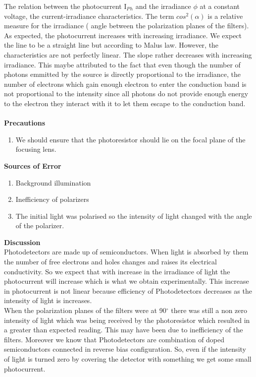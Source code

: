 \documentclass[12pt]{report}
\begin{document}
The relation between the photocurrent I$_P$$_h$ and the irradiance $\phi$ at a constant voltage, the current-irradiance characteristics. The term $cos^2(\alpha)$ is a relative measure for the irradiance ( angle between the polarization planes of the filters). As expected, the photocurrent increases with increasing irradiance. We expect the line to be a straight line but according to Malus law. However, the characteristics are not perfectly linear. The slope rather decreases with increasing irradiance. This maybe attributed to the fact that even though the number of photons emmitted by the source is directly proportional to the irradiance, the number of electrons which gain enough electron to enter the conduction band is not proportional to the intensity since all photons do not provide enough energy to the electron they interact with it to let them escape to the conduction band.\\\\
\textbf{Precautions}
\begin{enumerate}
	\item We should ensure that the photoresistor should lie on the focal plane of the focusing lens.
\end{enumerate}
\textbf{Sources of Error}
\begin{enumerate}
	\item Background illumination
	\item Inefficiency of polarizers
	\item The initial light was polarised so the intensity of light changed with the angle of the polarizer.
\end{enumerate}
\textbf{Discussion}\\
Photodetectors are made up of semiconductors. When light is absorbed by them the number of free electrons and holes changes and raises its electrical conductivity. So we expect that with increase in the irradiance of light the photocurrent will increase which is what we obtain experimentally. This increase in photocurrent is not linear because efficiency of Photodetectors decreases as the intensity of light is increases.\\ 
When the polarization planes of the filters were at 90$^\circ$ there was still a non zero intensity of light which was being received by the photoresistor which resulted in a greater than expected reading. This may have been due to inefficiency of the filters. Moreover we know that Photodetectors are combination of doped semiconductors connected in reverse bias configuration. So, even if the intensity of light is turned zero by covering the detector with something we get some small photocurrent.\\
$$
\end{document}
